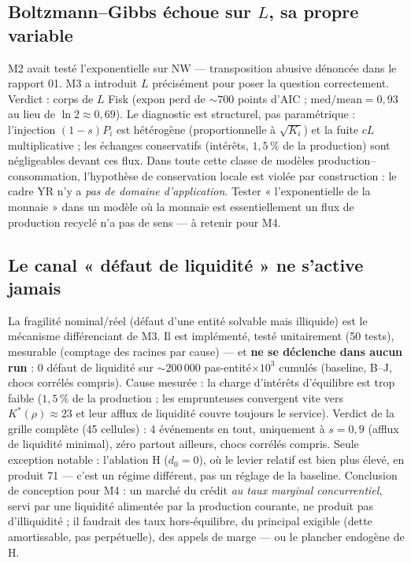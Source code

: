 \documentclass[11pt,a4paper]{article}
\newcommand{\NW}{\mathrm{NW}}
\begin{document}
\subsection{Boltzmann--Gibbs échoue sur $L$, sa propre variable}
M2 avait testé l'exponentielle sur $\NW$ — transposition abusive dénoncée
dans le rapport 01. M3 a introduit $L$ précisément pour poser la question
correctement. Verdict : corps de $L$ Fisk (expon perd de $\sim 700$ points
d'AIC ; $\mathrm{med/mean} = 0{,}93$ au lieu de $\ln 2 \approx 0{,}69$).
Le diagnostic est structurel, pas paramétrique : l'injection $(1-s)P_i$ est
hétérogène (proportionnelle à $\sqrt{K_i}$) et la fuite $cL$ multiplicative ;
les échanges conservatifs (intérêts, $1{,}5\,\%$ de la production) sont
négligeables devant ces flux. Dans toute cette classe de modèles
production--consommation, l'hypothèse de conservation locale est violée par
construction : le cadre YR n'y a \emph{pas de domaine d'application}. Tester
« l'exponentielle de la monnaie » dans un modèle où la monnaie est
essentiellement un flux de production recyclé n'a pas de sens — à retenir
pour M4.

\subsection{Le canal « défaut de liquidité » ne s'active jamais}
La fragilité nominal/réel (défaut d'une entité solvable mais illiquide) est
le mécanisme différenciant de M3. Il est implémenté, testé unitairement
(50 tests), mesurable (comptage des racines par cause) — et \textbf{ne se
déclenche dans aucun run} : 0 défaut de liquidité sur $\sim 200\,000$
pas-entité$\times 10^3$ cumulés (baseline, B--J, chocs corrélés compris).
Cause mesurée : la charge d'intérêts d'équilibre est trop faible
($1{,}5\,\%$ de la production ; les emprunteuses convergent vite vers
$K^*(\rho) \approx 23$ et leur afflux de liquidité couvre toujours le
service). Verdict de la grille complète (45 cellules) : 4 événements en
tout, uniquement à $s = 0{,}9$ (afflux de liquidité minimal), zéro partout
ailleurs, chocs corrélés compris. Seule exception notable : l'ablation H
($d_0 = 0$), où le levier relatif est bien plus élevé, en produit 71 —
c'est un régime différent, pas un réglage de la baseline. Conclusion de
conception pour M4 : un marché du crédit \emph{au taux marginal
concurrentiel}, servi par une liquidité alimentée par la production
courante, ne produit pas d'illiquidité ; il faudrait des taux
hors-équilibre, du principal exigible (dette amortissable, pas
perpétuelle), des appels de marge — ou le plancher endogène de H.
\end{document}
